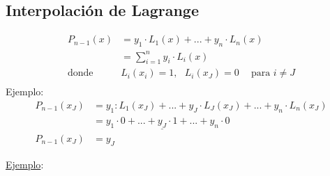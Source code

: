 \subsection{Interpolación de Lagrange} 
\begin{equation*}
 \begin{split}
  P_{n-1}(x) & =y_{1} \cdot L_{1}(x)+...+y_{n} \cdot L_{n}(x) \\
 & = \sum_{i=1}^{n} y_{i} \cdot L_{i}(x) \\
 \text{donde } \ \ \ \ & L_{i}(x_{i})=1, \ \ \ L_{i}(x_{J})=0 \ \ \ \ \text{ para } i\neq J \\
 \end{split}
\end{equation*}
Ejemplo: 
\begin{align*}
 P_{n-1}(x_{J}) & =y_{1}:L_{1}(x_{J})+...+y_{J} \cdot L_{J}(x_{J})+...+y_{n} \cdot L_{n}(x_{J}) \\
 & =y_{1} \cdot 0+...+ \underline{y_{J}} \cdot 1+...+y_{n} \cdot 0 \\
 P_{n-1}(x_{J}) & =y_{J}
\end{align*}
\newpage




 

 \underline{Ejemplo}: 

